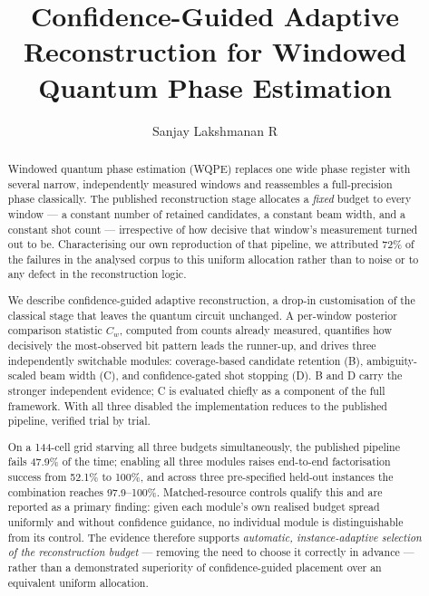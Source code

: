 \documentclass[preprint,11pt]{elsarticle}
\newcommand{\Cw}{C_w}
\begin{document}
\begin{frontmatter}

\title{Confidence-Guided Adaptive Reconstruction for Windowed Quantum
Phase Estimation}

\author[inst1]{Sanjay Lakshmanan R}

\address[inst1]{Department of Computer Science and Engineering,
Amrita Vishwa Vidyapeetham, Chennai, India}

\begin{abstract}
Windowed quantum phase estimation (WQPE) replaces one wide phase register
with several narrow, independently measured windows and reassembles a
full-precision phase classically. The published reconstruction stage
allocates a \emph{fixed} budget to every window --- a constant number of
retained candidates, a constant beam width, and a constant shot count ---
irrespective of how decisive that window's measurement turned out to be.
Characterising our own reproduction of that pipeline, we attributed 72\%
of the failures in the analysed corpus to this uniform allocation rather
than to noise or to any defect in the reconstruction logic.

We describe confidence-guided adaptive reconstruction, a drop-in
customisation of the classical stage that leaves the quantum circuit
unchanged. A per-window posterior comparison statistic $\Cw$, computed
from counts already measured, quantifies how decisively the most-observed
bit pattern leads the runner-up, and drives three independently
switchable modules: coverage-based candidate retention (B),
ambiguity-scaled beam width (C), and confidence-gated shot stopping (D).
B and D carry the stronger independent evidence; C is evaluated chiefly
as a component of the full framework. With all three disabled the
implementation reduces to the published pipeline, verified trial by
trial.

On a 144-cell grid starving all three budgets simultaneously, the
published pipeline fails 47.9\% of the time; enabling all three modules
raises end-to-end factorisation success from 52.1\% to 100\%, and across
three pre-specified held-out instances the combination reaches
97.9--100\%. Matched-resource controls qualify this and are reported as a
primary finding: given each module's own realised budget spread uniformly
and without confidence guidance, no individual module is distinguishable
from its control. The evidence therefore supports \emph{automatic,
instance-adaptive selection of the reconstruction budget} --- removing the
need to choose it correctly in advance --- rather than a demonstrated
superiority of confidence-guided placement over an equivalent uniform
allocation.


\end{abstract}
\end{frontmatter}
\end{document}

